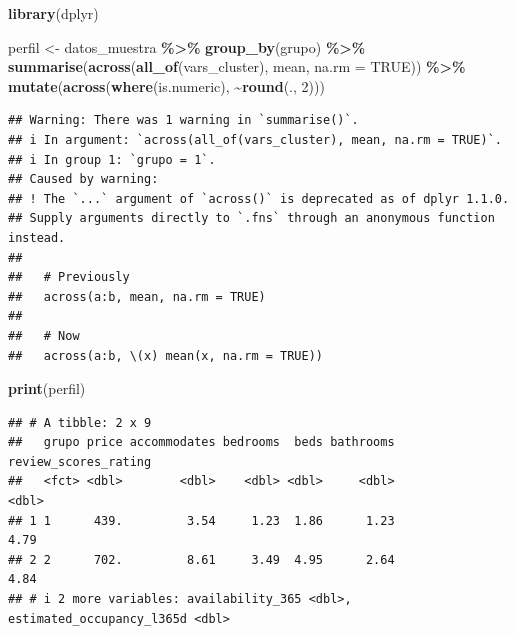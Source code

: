 \documentclass[
]{article}
\newenvironment{Shaded}{\begin{snugshade}}{\end{snugshade}}
\newcommand{\AttributeTok}[1]{\textcolor[rgb]{0.13,0.29,0.53}{#1}}
\newcommand{\ConstantTok}[1]{\textcolor[rgb]{0.56,0.35,0.01}{#1}}
\newcommand{\DecValTok}[1]{\textcolor[rgb]{0.00,0.00,0.81}{#1}}
\newcommand{\FunctionTok}[1]{\textcolor[rgb]{0.13,0.29,0.53}{\textbf{#1}}}
\newcommand{\NormalTok}[1]{#1}
\newcommand{\OtherTok}[1]{\textcolor[rgb]{0.56,0.35,0.01}{#1}}
\newcommand{\SpecialCharTok}[1]{\textcolor[rgb]{0.81,0.36,0.00}{\textbf{#1}}}
\begin{document}
\begin{Shaded}
\begin{Highlighting}[]
\FunctionTok{library}\NormalTok{(dplyr)}

\NormalTok{perfil }\OtherTok{\textless{}{-}}\NormalTok{ datos\_muestra }\SpecialCharTok{\%\textgreater{}\%}
  \FunctionTok{group\_by}\NormalTok{(grupo) }\SpecialCharTok{\%\textgreater{}\%}
  \FunctionTok{summarise}\NormalTok{(}\FunctionTok{across}\NormalTok{(}\FunctionTok{all\_of}\NormalTok{(vars\_cluster), mean, }\AttributeTok{na.rm =} \ConstantTok{TRUE}\NormalTok{)) }\SpecialCharTok{\%\textgreater{}\%}
  \FunctionTok{mutate}\NormalTok{(}\FunctionTok{across}\NormalTok{(}\FunctionTok{where}\NormalTok{(is.numeric), }\SpecialCharTok{\textasciitilde{}}\FunctionTok{round}\NormalTok{(., }\DecValTok{2}\NormalTok{)))}
\end{Highlighting}
\end{Shaded}

\begin{verbatim}
## Warning: There was 1 warning in `summarise()`.
## i In argument: `across(all_of(vars_cluster), mean, na.rm = TRUE)`.
## i In group 1: `grupo = 1`.
## Caused by warning:
## ! The `...` argument of `across()` is deprecated as of dplyr 1.1.0.
## Supply arguments directly to `.fns` through an anonymous function instead.
## 
##   # Previously
##   across(a:b, mean, na.rm = TRUE)
## 
##   # Now
##   across(a:b, \(x) mean(x, na.rm = TRUE))
\end{verbatim}

\begin{Shaded}
\begin{Highlighting}[]
\FunctionTok{print}\NormalTok{(perfil)}
\end{Highlighting}
\end{Shaded}

\begin{verbatim}
## # A tibble: 2 x 9
##   grupo price accommodates bedrooms  beds bathrooms review_scores_rating
##   <fct> <dbl>        <dbl>    <dbl> <dbl>     <dbl>                <dbl>
## 1 1      439.         3.54     1.23  1.86      1.23                 4.79
## 2 2      702.         8.61     3.49  4.95      2.64                 4.84
## # i 2 more variables: availability_365 <dbl>, estimated_occupancy_l365d <dbl>
\end{verbatim}
\end{document}
